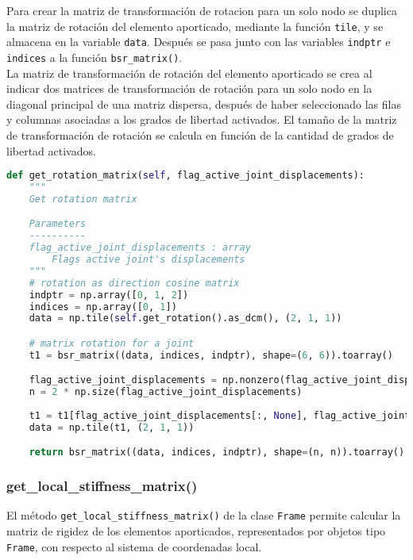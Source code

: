 Para crear la matriz de transformación de rotacion para un solo nodo se duplica la matriz de rotación del elemento aporticado, mediante la función \verb|tile|, y se almacena en la variable \verb|data|. Después se pasa junto con las variables \verb|indptr| e \verb|indices| a la función \verb|bsr_matrix()|.\\

La matriz de transformación de rotación del elemento aporticado se crea al indicar dos matrices de transformación de rotación para un solo nodo en la diagonal principal de una matriz dispersa, después de haber seleccionado las filas y columnas asociadas a los grados de libertad activados. El tamaño de la matriz de transformación de rotación se calcula en función de la cantidad de grados de libertad activados.\\

\begin{lstlisting}[language=Python,caption=Método \texttt{get\_rotation\_matrix()} de la clase \texttt{Frame}.,label=alg:Frame-get_rotation_matrix, frame=single]
def get_rotation_matrix(self, flag_active_joint_displacements):
    """
    Get rotation matrix

    Parameters
    ----------
    flag_active_joint_displacements : array
        Flags active joint's displacements
    """
    # rotation as direction cosine matrix
    indptr = np.array([0, 1, 2])
    indices = np.array([0, 1])
    data = np.tile(self.get_rotation().as_dcm(), (2, 1, 1))

    # matrix rotation for a joint
    t1 = bsr_matrix((data, indices, indptr), shape=(6, 6)).toarray()

    flag_active_joint_displacements = np.nonzero(flag_active_joint_displacements)[0]
    n = 2 * np.size(flag_active_joint_displacements)
    
    t1 = t1[flag_active_joint_displacements[:, None], flag_active_joint_displacements]
    data = np.tile(t1, (2, 1, 1))

    return bsr_matrix((data, indices, indptr), shape=(n, n)).toarray()
\end{lstlisting}

\subsubsection{get\_local\_stiffness\_matrix()}
El método \verb|get_local_stiffness_matrix()| de la clase \verb|Frame| permite calcular la matriz de rigidez de los elementos aporticados, representados por objetos tipo \verb|Frame|, con respecto al sistema de coordenadas local.\\

